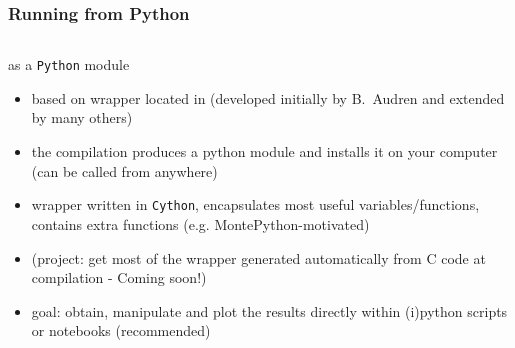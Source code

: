\begin{frame}[fragile]
	\frametitle{Running {\Red \CLASS{}} from Python}
	
	\begin{columns}
		\begin{block}{\CLASS{} as a {\tt Python} module}
			\begin{itemize}
				\item based on wrapper located in  (developed initially by B.~Audren and extended by many others)
				\item the compilation produces a python module  and installs it on your computer (can be called from anywhere)
				\item wrapper written in {\Red \tt Cython}, encapsulates most useful {\Red \CLASS{}} variables/functions, contains extra functions (e.g. MontePython-motivated)
				\item (project: get most of the wrapper generated automatically from C code at compilation - Coming soon!)
				\item goal: obtain, manipulate and plot the results directly within (i)python scripts or notebooks (recommended)
			\end{itemize}
		\end{block}
	\end{columns}
	
	
\end{frame}



